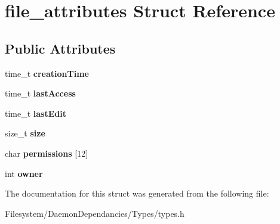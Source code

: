 \hypertarget{structfile__attributes}{}\section{file\+\_\+attributes Struct Reference}
\label{structfile__attributes}
\subsection*{Public Attributes}
\begin{DoxyCompactItemize}
\item 
\mbox{\label{structfile__attributes_a9fa92e6a7d6ac7f18df7940697524411}} 
time\+\_\+t {\bfseries creation\+Time}
\item 
\mbox{\label{structfile__attributes_a9b16144fd6ce8d982afc738058f07fa3}} 
time\+\_\+t {\bfseries last\+Access}
\item 
\mbox{\label{structfile__attributes_ad4592775c8cb9a899a12ca551329a936}} 
time\+\_\+t {\bfseries last\+Edit}
\item 
\mbox{\label{structfile__attributes_a753691702c194d2e43c0fb62e6cd4ee1}} 
size\+\_\+t {\bfseries size}
\item 
\mbox{\label{structfile__attributes_a6af710c43bfc31b1a005c9ad7251f801}} 
char {\bfseries permissions} \mbox{[}12\mbox{]}
\item 
\mbox{\label{structfile__attributes_a74be4a864fa3f38eff632b4b25654b97}} 
int {\bfseries owner}
\end{DoxyCompactItemize}


The documentation for this struct was generated from the following file\+:\begin{DoxyCompactItemize}
\item 
Filesystem/\+Daemon\+Dependancies/\+Types/types.\+h\end{DoxyCompactItemize}
